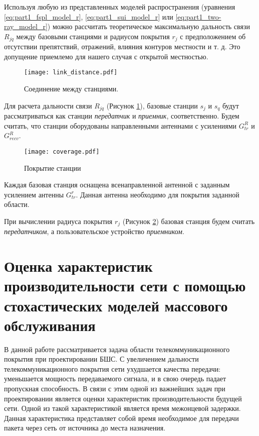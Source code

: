 Используя любую из представленных моделей распространения (уравнения \cref{eq:part1_fspl_model_r}, \cref{eq:part1_sui_model_r} или \cref{eq:part1_two-ray_model_r}) можно рассчитать теоретическое максимальную дальность связи $ R_{jq}$ между базовыми станциями и радиусом покрытия $ r_j $ с предположением об отсутствии препятствий, отражений, влияния контуров местности и т. д. Это допущение приемлемо для нашего случая с открытой местностью.

\begin{figure}[h!]
  \centering
   \texttt{[image: link\_distance.pdf]}
\caption{Соединение между станциями.}
\label{fig:part3_link_distance}
\end{figure}

Для расчета дальности связи $R_{jq}$ (Рисунок \cref{fig:part3_link_distance}), базовые станции $s_j$ и $s_q$ будут рассматриваться как станции \textit{передатчик} и \textit{приемник}, соответственно. Будем считать, что станции оборудованы направленными антеннами с усилениями $G_{tr}^{R}$ и $G_{recv}^{R}$.

\begin{figure}[h!]
  \centering
   \texttt{[image: coverage.pdf]}
\caption{Покрытие станции}
\label{fig:part3_coverage}
\end{figure}

Каждая базовая станция оснащена всенаправленной антенной с заданным усилением антенны $G_ {tr}^{r}$. Данная антенна необходимо для покрытия заданной области.


При вычислении радиуса покрытия $r_j$ (Рисунок  \cref{fig:part3_coverage}) базовая станция будем считать \textit{передатчиком}, а пользовательское устройство \textit{приемником}.


\section{Оценка характеристик производительности сети с помощью стохастических моделей массового обслуживания}

В данной работе рассматривается задача области телекоммуникационного покрытия при проектировании БШС.  С увеличением дальности телекоммуникационного покрытия сети ухудшается качества передачи: уменьшается мощность передаваемого сигнала, и в свою очередь падает пропускная способность. В связи с этим одной из важнейших задач при проектировании является оценки характеристик производительности будущей сети. Одной из такой характеристикой является время межонцевой задержки. Данная характеристика представляет собой время необходимое для передачи пакета через сеть от источника до места назначения.
 

